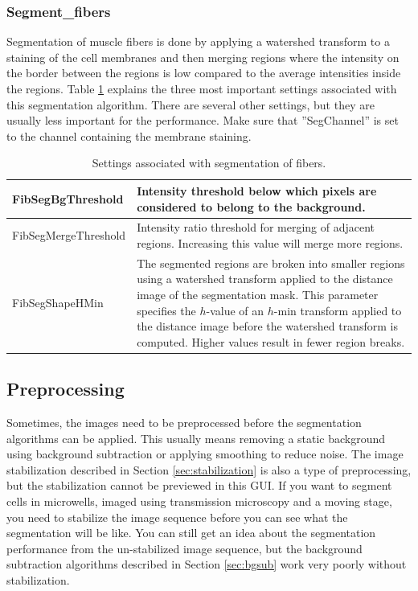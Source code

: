 \documentclass[a4paper, oneside, onecolumn, 11pt]{article}
\newcommand{\setting}[1]{''#1''}
\begin{document}
\subsubsection{Segment\_fibers}
\label{sec:segmentation-fibers}
Segmentation of muscle fibers is done by applying a watershed transform to a staining of the cell membranes and then merging regions where the intensity on the border between the regions is low compared to the average intensities inside the regions. Table \ref{tab:fiber-settings} explains the three most important settings associated with this segmentation algorithm. There are several other settings, but they are usually less important for the performance. Make sure that \setting{SegChannel} is set to the channel containing the membrane staining.

\begin{table}[!htb]
\caption{Settings associated with segmentation of fibers.}
\label{tab:fiber-settings}
\begin{tabularx}{\textwidth}{lX}
\hline
FibSegBgThreshold & Intensity threshold below which pixels are considered to belong to the background. \\[5pt] \hline
FibSegMergeThreshold & Intensity ratio threshold for merging of adjacent regions. Increasing this value will merge more regions. \\[5pt] \hline
FibSegShapeHMin & The segmented regions are broken into smaller regions using a watershed transform applied to the distance image of the segmentation mask. This parameter specifies the $h$-value of an $h$-min transform applied to the distance image before the watershed transform is computed. Higher values result in fewer region breaks. \\[5pt] \hline
\end{tabularx}
\end{table}

\subsection{Preprocessing}
\label{sec:segmentation-preprocessing}
Sometimes, the images need to be preprocessed before the segmentation algorithms can be applied. This usually means removing a static background using background subtraction or applying smoothing to reduce noise. The image stabilization described in Section \ref{sec:stabilization} is also a type of preprocessing, but the stabilization cannot be previewed in this GUI. If you want to segment cells in microwells, imaged using transmission microscopy and a moving stage, you need to stabilize the image sequence before you can see what the segmentation will be like. You can still get an idea about the segmentation performance from the un-stabilized image sequence, but the background subtraction algorithms described in Section \ref{sec:bgsub} work very poorly without stabilization.
\end{document}

